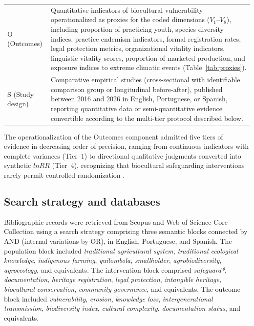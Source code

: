 \documentclass[12pt,a4paper]{article}
\begin{document}
\begin{table}[htbp]
\begin{tabular}{p{3.5cm} p{9.5cm}}
O (Outcomes) & Quantitative indicators of biocultural vulnerability operationalized as proxies for the coded dimensions ($V_1$--$V_8$), including proportion of practicing youth, species diversity indices, practice endemism indicators, formal registration rates, legal protection metrics, organizational vitality indicators, linguistic vitality scores, proportion of marketed production, and exposure indices to extreme climatic events (Table~\ref{tab:proxies}). \\
S (Study design) & Comparative empirical studies (cross-sectional with identifiable comparison group or longitudinal before-after), published between 2016 and 2026 in English, Portuguese, or Spanish, reporting quantitative data or semi-quantitative evidence convertible according to the multi-tier protocol described below. \\
\bottomrule
\end{tabular}
\end{table}

The operationalization of the Outcomes component admitted five tiers of evidence in decreasing order of precision, ranging from continuous indicators with complete variances (Tier~1) to directional qualitative judgments converted into synthetic $lnRR$ (Tier~4), recognizing that biocultural safeguarding interventions rarely permit controlled randomization \citep{Shadish2002}.

\subsection{Search strategy and databases}
\label{sec:search}

Bibliographic records were retrieved from Scopus and Web of Science Core Collection using a search strategy comprising three semantic blocks connected by AND (internal variations by OR), in English, Portuguese, and Spanish. The population block included \textit{traditional agricultural system}, \textit{traditional ecological knowledge}, \textit{indigenous farming}, \textit{quilombola}, \textit{smallholder}, \textit{agrobiodiversity}, \textit{agroecology}, and equivalents. The intervention block comprised \textit{safeguard*}, \textit{documentation}, \textit{heritage registration}, \textit{legal protection}, \textit{intangible heritage}, \textit{biocultural conservation}, \textit{community governance}, and equivalents. The outcome block included \textit{vulnerability}, \textit{erosion}, \textit{knowledge loss}, \textit{intergenerational transmission}, \textit{biodiversity index}, \textit{cultural complexity}, \textit{documentation status}, and equivalents.
\end{document}
